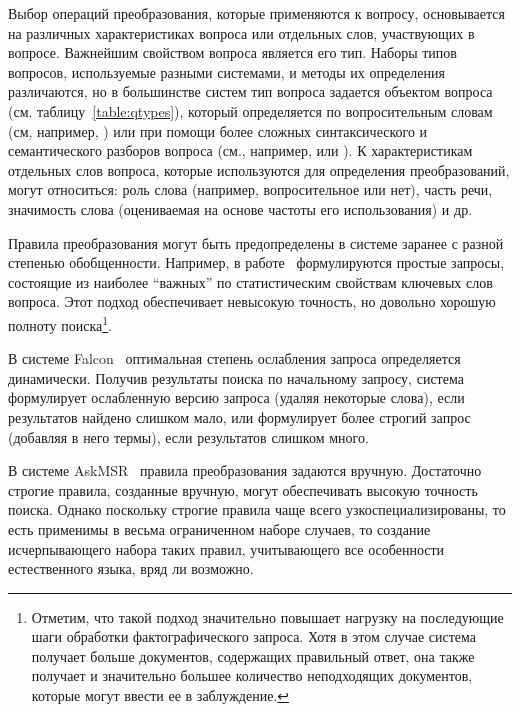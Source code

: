\documentclass{article}
\begin{document}
Выбор операций преобразования, которые применяются к вопросу,
основывается на различных характеристиках
вопроса или отдельных слов, участвующих в вопросе.
Важнейшим свойством вопроса является его тип.
Наборы типов вопросов, используемые разными системами,
и методы их определения  различаются,
но в большинстве систем
тип вопроса задается объектом вопроса (см. таблицу~\ref{table:qtypes}),
который определяется
по вопросительным словам (см, например, \cite{qa:Tritus})
или при помощи более сложных синтаксического и семантического
разборов вопроса (см., например, \cite{qa:Harabagiu} или \cite{qa:clarke:passage}).
К характеристикам отдельных слов вопроса, которые используются
для определения преобразований, могут относиться:
роль слова (например, вопросительное или нет), часть речи,
значимость слова (оцениваемая на основе частоты его использования)
 и др.~\cite{qa:radev:qasm}


Правила преобразования могут быть предопределены в системе заранее с разной
степенью обобщенности. Например, в работе~\cite{qa:soubbotin} формулируются
простые запросы, состоящие из наиболее ``важных'' по статистическим
свойствам ключевых слов вопроса. Этот подход обеспечивает невысокую
точность, но довольно хорошую полноту поиска\footnote{ 
Отметим, что такой подход значительно повышает нагрузку на последующие шаги
обработки фактографического запроса.
Хотя в этом случае система получает больше документов, содержащих
правильный ответ, %
она также получает и
значительно большее количество неподходящих документов,
которые могут ввести ее в заблуждение.
}. 

В системе Falcon~\cite{qa:Harabagiu} оптимальная 
степень ослабления запроса определяется динамически.
Получив результаты поиска по начальному запросу, система формулирует ослабленную 
версию запроса (удаляя некоторые слова), %
если результатов найдено слишком мало,
или формулирует более строгий запрос (добавляя в него термы), если результатов слишком много.

В системе AskMSR~\cite{qa:dumais:redundancy} правила преобразования задаются вручную. 
Достаточно строгие правила, созданные вручную, могут обеспечивать высокую точность поиска.
Однако поскольку строгие правила чаще всего узкоспециализированы,
то есть применимы в весьма ограниченном наборе случаев,
то создание исчерпывающего набора таких правил,
учитывающего все особенности естественного языка, вряд ли возможно. %
\end{document}
